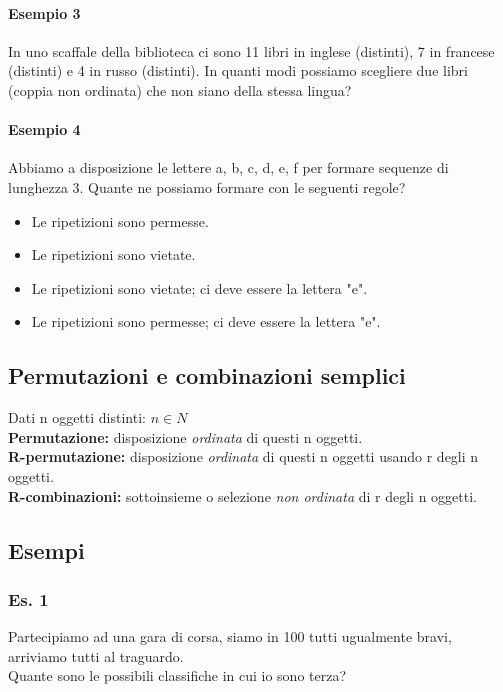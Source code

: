 \paragraph{Esempio 3} In uno scaffale della biblioteca ci sono 11 libri in inglese (distinti),
7 in francese (distinti) e 4 in russo (distinti).
In quanti modi possiamo scegliere due libri (coppia non ordinata) che non siano
della stessa lingua?

\paragraph{Esempio 4} Abbiamo a disposizione le lettere a, b, c, d, e, f per formare sequenze di lunghezza 3.
Quante ne possiamo formare con le seguenti regole?
\begin{itemize}
    \item Le ripetizioni sono permesse.
    \item Le ripetizioni sono vietate.
    \item Le ripetizioni sono vietate; ci deve essere la lettera "e".
    \item Le ripetizioni sono permesse; ci deve essere la lettera "e".
\end{itemize}

\subsection{Permutazioni e combinazioni semplici} 
Dati n oggetti distinti: \(n \in N\) \\
\textbf{Permutazione:} disposizione \emph{ordinata} di questi n oggetti. \\
\textbf{R-permutazione:} disposizione \emph{ordinata} di questi n oggetti usando r degli n oggetti. \\
\textbf{R-combinazioni:} sottoinsieme o selezione \emph{non ordinata} di r degli n oggetti. \\

\subsection{Esempi}
\subsubsection{Es. 1} Partecipiamo ad una gara di corsa, siamo in 100 tutti ugualmente bravi,
arriviamo tutti al traguardo. \\ 
Quante sono le possibili classifiche in cui io sono terza?

